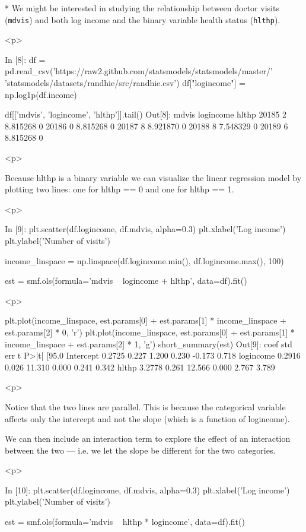 *   We might be interested in studying the relationship between doctor visits (\texttt{mdvis}) and both log income and the binary variable health status (\texttt{hlthp}).




<p>

	
In [8]:
df = pd.read_csv('https://raw2.github.com/statsmodels/statsmodels/master/'
                 'statsmodels/datasets/randhie/src/randhie.csv')
df["logincome"] = np.log1p(df.income)

df[['mdvis', 'logincome', 'hlthp']].tail()
Out[8]:
mdvis	logincome	hlthp
20185	2	8.815268	0
20186	0	8.815268	0
20187	8	8.921870	0
20188	8	7.548329	0
20189	6	8.815268	0


<p>

	
Because hlthp is a binary variable we can visualize the linear regression model by plotting two lines: one for hlthp == 0 and one for hlthp == 1.


<p>

	
In [9]:
plt.scatter(df.logincome, df.mdvis, alpha=0.3)
plt.xlabel('Log income')
plt.ylabel('Number of visits')

income_linspace = np.linspace(df.logincome.min(), df.logincome.max(), 100)

est = smf.ols(formula='mdvis ~ logincome + hlthp', data=df).fit()


<p>

	
plt.plot(income_linspace, est.params[0] + est.params[1] * income_linspace + est.params[2] * 0, 'r')
plt.plot(income_linspace, est.params[0] + est.params[1] * income_linspace + est.params[2] * 1, 'g')
short_summary(est)
Out[9]:
coef	std err	t	P>|t|	[95.0%
Intercept	0.2725	0.227	1.200	0.230	-0.173 0.718
logincome	0.2916	0.026	11.310	0.000	0.241 0.342
hlthp	3.2778	0.261	12.566	0.000	2.767 3.789


<p>

	
Notice that the two lines are parallel. This is because the categorical variable affects only the intercept and not the slope (which is a function of logincome).

We can then include an interaction term to explore the effect of an interaction between the two — i.e. we let the slope be different for the two categories.


<p>

	
In [10]:
plt.scatter(df.logincome, df.mdvis, alpha=0.3)
plt.xlabel('Log income')
plt.ylabel('Number of visits')

est = smf.ols(formula='mdvis ~ hlthp * logincome', data=df).fit()

